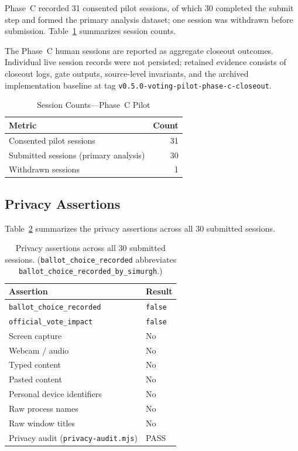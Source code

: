 \documentclass[conference]{IEEEtran}
\begin{document}
Phase~C recorded 31 consented pilot sessions, of which 30 completed the submit
step and formed the primary analysis dataset; one session was withdrawn before
submission. Table~\ref{tab:sessions} summarizes session counts.

The Phase~C human sessions are reported as aggregate closeout outcomes.
Individual live session records were not persisted; retained evidence consists
of closeout logs, gate outputs, source-level invariants, and the archived
implementation baseline at tag \texttt{v0.5.0-voting-pilot-phase-c-closeout}.

\begin{table}[!t]
  \caption{Session Counts---Phase~C Pilot}
  \centering
  \begin{tabular}{lr}
    \toprule
    Metric & Count \\
    \midrule
    Consented pilot sessions & 31 \\
    Submitted sessions (primary analysis) & 30 \\
    Withdrawn sessions & 1 \\
    \bottomrule
  \end{tabular}
  \label{tab:sessions}
\end{table}

\subsection{Privacy Assertions}

Table~\ref{tab:privacy} summarizes the privacy assertions across all 30 submitted sessions.

\begin{table}[!t]
  \caption{Privacy assertions across all 30 submitted sessions.
           (\texttt{ballot\_choice\_recorded} abbreviates
           \texttt{ballot\_choice\_recorded\_by\_simurgh}.)}
  \centering
  \begin{tabular}{ll}
    \toprule
    Assertion & Result \\
    \midrule
    \texttt{ballot\_choice\_recorded} & \texttt{false} \\
    \texttt{official\_vote\_impact}   & \texttt{false} \\
    Screen capture & No \\
    Webcam / audio & No \\
    Typed content & No \\
    Pasted content & No \\
    Personal device identifiers & No \\
    Raw process names & No \\
    Raw window titles & No \\
    Privacy audit (\texttt{privacy-audit.mjs}) & PASS \\
    \bottomrule
  \end{tabular}
  \label{tab:privacy}
\end{table}
\end{document}
